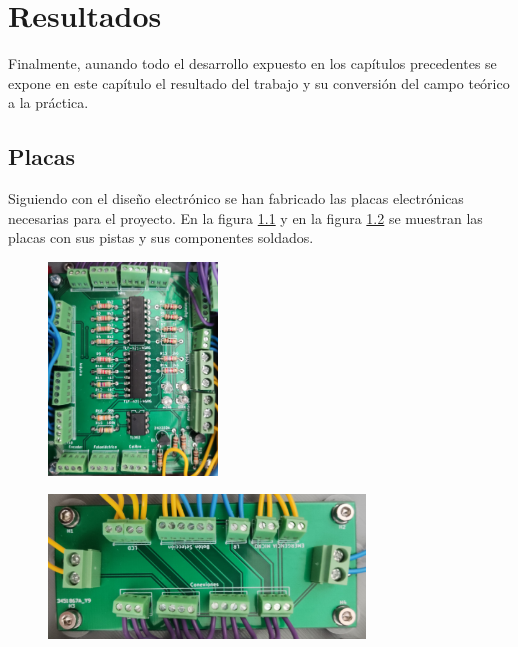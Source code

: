 \chapter{Resultados}\label{chp-07}

Finalmente, aunando todo el desarrollo expuesto en los capítulos precedentes se expone en este
capítulo el resultado del trabajo y su conversión del campo teórico a la práctica.

\section{Placas}

Siguiendo con el diseño electrónico se han fabricado las placas electrónicas necesarias para el proyecto.
En la figura \ref{fig:placafondo} y en la figura \ref{fig:placatapa} se muestran las placas con 
sus pistas y sus componentes soldados.

\begin{figure}[hbtp]%
    \centering 
        \includegraphics[width=0.4\textwidth]{07-resultados/placafondo.jpg}
    \caption{}
    \label{fig:placafondo} 
\end{figure}

\begin{figure}[hbtp]%
    \centering 
        \includegraphics[width=0.75\textwidth]{07-resultados/placatapa.jpg}
    \caption{}
    \label{fig:placatapa} 
\end{figure}

